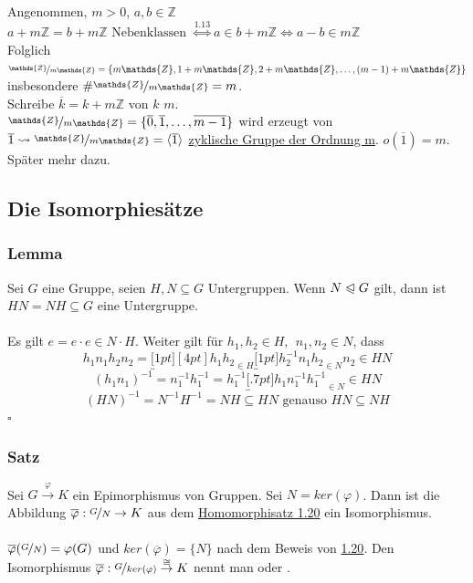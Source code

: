 Angenommen, $m>0$, $a,b \in \mathds{Z}$\\
$a+m\mathds{Z}=b+m\mathds{Z} \text{ Nebenklassen }\stackrel{\hyperref[sub:nebenklassen]{1.13}}{\Leftrightarrow} a\in b+m\mathds{Z} \Leftrightarrow a-b \in m\mathds{Z}$\\
Folglich $\nicefrac{\mathds{Z}}{m\mathds{Z}}=\{m\mathds{Z},1+m\mathds{Z},2+m\mathds{Z},\dots,(m-1)+m\mathds{Z} \}$ insbesondere $\#\nicefrac{\mathds{Z}}{m\mathds{Z}}=m$.\\
Schreibe $\overline{k}=k+m\mathds{Z}$  von $k$  $m$.\\
$\nicefrac{\mathds{Z}}{m\mathds{Z}}=\{\overline{0},\overline{1},\dots,\overline{m-1} \}$ wird erzeugt von $\overline{1} \rightsquigarrow \nicefrac{\mathds{Z}}{m\mathds{Z}}=\lh{\overline{1}}$ \uline{zyklische Gruppe der Ordnung m}. $o(\overline{1})=m$. Später mehr dazu.

\subsection{Die Isomorphiesätze}
\label{sub:isomorphiesätze}
\subsubsection*{Lemma}
Sei $G$ eine Gruppe, seien $H,N \subseteq G$ Untergruppen. Wenn $N\trianglelefteqslant G$ gilt, dann ist $ HN=NH \subseteq G$ eine Untergruppe.\\

\\
Es gilt $e=e\cdot e\in N\cdot H$. Weiter gilt für $h_1,h_2 \in H,~~n_1,n_2 \in N$, dass
\[h_1n_1h_2n_2=\underbracket[1pt][4pt]{h_1h_2}_{\in H} \underbracket[1pt]{h_2^{-1}n_1h_2}_{\in N}n_2 \in HN \]
\[(h_1n_1)^{-1}=n_1^{-1}h_1^{-1}=h_1^{-1}\underbracket[.7pt]{h_1n_1^{-1}h_1^{-1}}_{\in N} \in HN \]
\[(HN)^{-1}=N^{-1}H^{-1}=NH \subseteq HN \text{ genauso } HN \subseteq NH \]
\hfill $\square$

\subsubsection*{Satz}
Sei $G\stackrel{\varphi}{\to}K$ ein Epimorphismus von Gruppen. Sei $N=ker(\varphi)$. Dann ist die Abbildung $\overline{\varphi}:\nicefrac{G}{N}\to K$ aus dem \hyperref[sub:der_homomorphiesatz]{Homomorphisatz 1.20} ein Isomorphismus.\\

\\
$\overline{\varphi}(\nicefrac{G}{N})=\varphi(G)$ und $ker(\overline{\varphi})=\{N\}$ nach dem Beweis von \hyperref[sub:der_homomorphiesatz]{1.20}. Den Isomorphismus $\overline{\varphi}:\nicefrac{G}{ker(\varphi)} \stackrel{\cong}{\to}K$ nennt man  oder .

